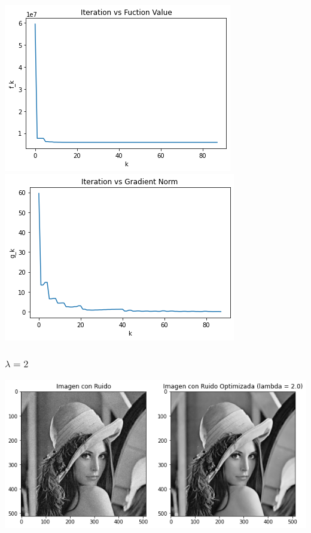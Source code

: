 \documentclass[11pt,letterpaper]{article}
\theoremstyle{definition}
\theoremstyle{definition}
\theoremstyle{definition}
\begin{document}
\begin{center}
	\includegraphics[width=0.6\linewidth]{graficas/frpr/funcion_1}
	\includegraphics[width=0.6\linewidth]{graficas/frpr/gradiente_1}
\end{center}

\subsubsection{$ \lambda = 2 $}
\begin{center}
	\includegraphics[width=0.75\linewidth]{graficas/frpr/optimizada_2}
\end{center}
\end{document}
